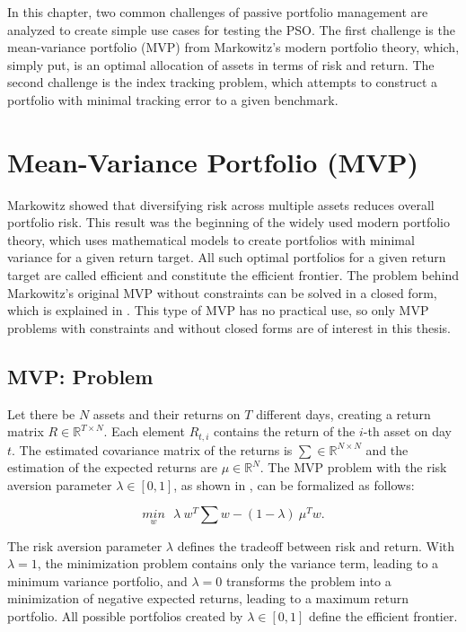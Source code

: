 \documentclass[
  oneside, a4paper, 12pt, openany]{book}
\theoremstyle{definition}
\theoremstyle{definition}
\theoremstyle{definition}
\theoremstyle{definition}
\theoremstyle{remark}
\begin{document}
In this chapter, two common challenges of passive portfolio management are analyzed to create simple use cases for testing the PSO. The first challenge is the mean-variance portfolio (MVP) from Markowitz's modern portfolio theory, which, simply put, is an optimal allocation of assets in terms of risk and return. The second challenge is the index tracking problem, which attempts to construct a portfolio with minimal tracking error to a given benchmark.

\hypertarget{mean-variance-portfolio-mvp}{%
\section{Mean-Variance Portfolio (MVP)}\label{mean-variance-portfolio-mvp}}

Markowitz showed that diversifying risk across multiple assets reduces overall portfolio risk. This result was the beginning of the widely used modern portfolio theory, which uses mathematical models to create portfolios with minimal variance for a given return target. All such optimal portfolios for a given return target are called efficient and constitute the efficient frontier. The problem behind Markowitz's original MVP without constraints can be solved in a closed form, which is explained in \citep{Eric2021}. This type of MVP has no practical use, so only MVP problems with constraints and without closed forms are of interest in this thesis.

\hypertarget{mvp-problem}{%
\subsection{MVP: Problem}\label{mvp-problem}}

Let there be \(N\) assets and their returns on \(T\) different days, creating a return matrix \(R \in \mathbb{R}^{T \times N}\). Each element \(R_{t,i}\) contains the return of the \(i\)-th asset on day \(t\). The estimated covariance matrix of the returns is \(\textstyle\sum \in \mathbb{R}^{N \times N}\) and the estimation of the expected returns are \(\mu \in \mathbb{R}^{N}\). The MVP problem with the risk aversion parameter \(\lambda \in [0,1]\), as shown in \citep{Mari2005}, can be formalized as follows:

\begin{equation} 
\underset{w}{min} \ \ \ \lambda \ w^T \textstyle\sum w - (1-\lambda) \ \mu^T w.
\label{eq:MVP}
\end{equation}

The risk aversion parameter \(\lambda\) defines the tradeoff between risk and return. With \(\lambda = 1\), the minimization problem contains only the variance term, leading to a minimum variance portfolio, and \(\lambda = 0\) transforms the problem into a minimization of negative expected returns, leading to a maximum return portfolio. All possible portfolios created by \(\lambda \in [0, 1]\) define the efficient frontier.
\end{document}
